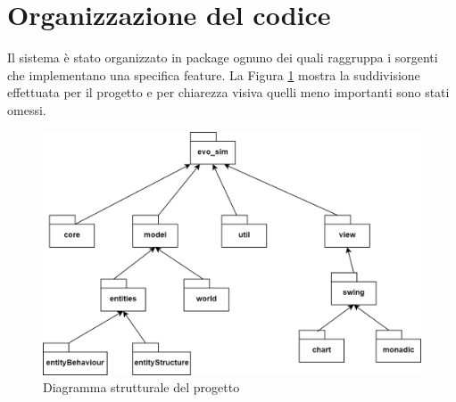 \section{Organizzazione del codice}
Il sistema è stato organizzato in package ognuno dei quali raggruppa i sorgenti che implementano una specifica feature. La Figura \ref{fig:pakage} mostra la suddivisione effettuata per il progetto e per chiarezza visiva quelli meno importanti sono stati omessi.

\begin{figure}[h!]
\centering
\includegraphics[width=\textwidth, scale=0.44]{img/Packages.png}
\caption{Diagramma strutturale del progetto}
\label{fig:pakage}
\end{figure}

